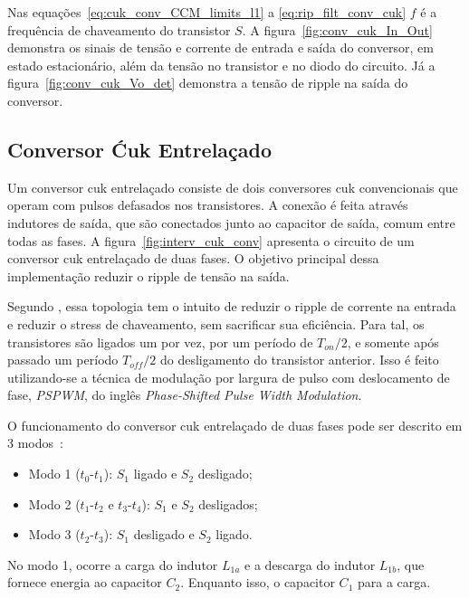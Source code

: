 \documentclass[
	12pt,				%
	openany,
	onseside,
	a4paper,			%
	english,			%
	french,				%
	spanish,			%
	brazil,				%
	]{abntex2}
\begin{document}
Nas equações~\ref{eq:cuk_conv_CCM_limits_l1} a \ref{eq:rip_filt_conv_cuk} $f$ é a frequência de chaveamento do transistor $S$. A figura~\ref{fig:conv_cuk_In_Out} demonstra os sinais de tensão e corrente de entrada e saída do conversor, em estado estacionário, além da tensão no transistor e no diodo do circuito. Já a figura~\ref{fig:conv_cuk_Vo_det} demonstra a tensão de ripple na saída do conversor.


\subsection{Conversor Ćuk Entrelaçado}

Um conversor cuk entrelaçado consiste de  dois conversores cuk convencionais que operam com pulsos defasados nos transistores. A conexão é feita através indutores de saída, que são conectados junto ao capacitor de saída, comum entre todas as fases. A figura~\ref{fig:interv_cuk_conv} apresenta o circuito de um conversor cuk entrelaçado de duas fases. O objetivo principal dessa implementação reduzir o ripple de tensão na saída.

Segundo , essa topologia tem o intuito de reduzir o ripple de corrente na entrada e reduzir o stress de chaveamento, sem sacrificar sua eficiência. Para tal, os transistores são ligados um por vez, por um período de ${T_{on}}/{2}$, e somente após passado um período ${T_{off}}/{2}$ do desligamento do transistor anterior. Isso é feito  utilizando-se a técnica de modulação por largura de pulso com deslocamento de fase, \emph{PSPWM}, do inglês \textit{Phase-Shifted Pulse Width Modulation}.

O funcionamento do conversor cuk entrelaçado de duas fases pode ser descrito em 3 modos~\cite{JOSEPH_2015_Intervealed_CUK}:
\begin{itemize}%
	\item Modo 1 ($t_0$-$t_1$): $S_1$ ligado e $S_2$ desligado;
	\item Modo 2 ($t_1$-$t_2$ e $t_3$-$t_4$): $S_1$ e $S_2$ desligados;
	\item Modo 3 ($t_2$-$t_3$): $S_1$ desligado e $S_2$ ligado.
\end{itemize}

No modo 1, ocorre a carga do indutor $L_{1a}$ e a descarga do indutor $L_{1b}$, que fornece energia ao capacitor $C_2$. Enquanto isso, o capacitor $C_1$ para a carga.
\end{document}
